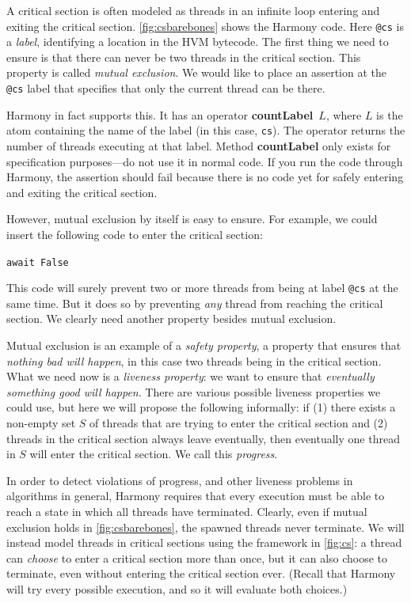 \documentclass{report}
\newenvironment{code}{
\tcolorbox
}{
\endtcolorbox
}
\begin{document}
%

A critical section is often modeled as threads in an infinite loop
entering and exiting the critical section.
\autoref{fig:csbarebones} shows the Harmony code.
Here \texttt{@cs} is a \emph{label},
%
identifying a location in the HVM bytecode.  The first thing we need to
ensure is that there can never be two threads in the critical section.
This property is called \emph{mutual exclusion}.
%
We would like to place an assertion at the \texttt{@cs} label that
specifies that only the current thread can be there.

Harmony in fact supports this.
It has an operator \textbf{countLabel}~$L$,
%
where $L$
is the atom containing the name of the label (in this case, \texttt{cs}).
The operator returns the number of threads executing at that label.
Method \textbf{countLabel} only exists for specification purposes---do not
use it in normal code.
If you run the code through Harmony, the assertion should fail because
there is no code yet for safely entering and exiting the critical section.

However, mutual exclusion by itself is easy to ensure.
For example, we could insert the following code to enter the
critical section:
\begin{code}
\texttt{await False}
\end{code}
This code will surely prevent two or more threads from being
at label \texttt{@cs} at the same time.
But it does so by preventing \emph{any} thread from reaching
the critical section.
We clearly need another property besides mutual exclusion.

Mutual exclusion is an example of a \emph{safety property},
%
a property that ensures that \emph{nothing bad will happen}, in this case
two threads being in the critical section.
What we need now is a \emph{liveness property}:
%
we want to ensure that
\emph{eventually something good will happen}.
There are various possible liveness properties we could use,
but here we will propose the following informally: if
(1) there exists a non-empty
set $S$ of threads that are trying to enter the critical section and
(2) threads in the critical section always leave eventually, then
eventually one thread in $S$ will enter the critical section.
We call this \emph{progress}.
%

In order to detect violations of progress, and other liveness problems in
algorithms in general, Harmony requires that every execution must be
able to reach a state in which all threads have terminated.
Clearly, even if mutual exclusion holds in \autoref{fig:csbarebones},
the spawned threads never terminate.  We
will instead model threads in critical sections using the framework in
\autoref{fig:cs}: a thread can \emph{choose} to enter a
critical section more than once, but it can also choose to terminate, even
without entering the critical section ever.
(Recall that Harmony will try every possible execution, and so it will evaluate
both choices.)
\end{document}
